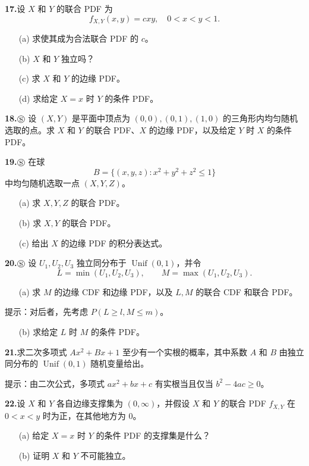 \documentclass[UTF8,12pt,a4paper,fontset=fandol]{ctexart}
\begin{document}
\noindent\textbf{17.}\quad 设 $X$ 和 $Y$ 的联合 PDF 为
\[
  f_{X,Y}(x,y)=cxy,\quad 0<x<y<1.
\]
\begin{enumerate}
  \item[(a)] 求使其成为合法联合 PDF 的 $c$。
  \item[(b)] $X$ 和 $Y$ 独立吗？
  \item[(c)] 求 $X$ 和 $Y$ 的边缘 PDF。
  \item[(d)] 求给定 $X=x$ 时 $Y$ 的条件 PDF。
\end{enumerate}

\noindent\textbf{18.}\quad $\circledS$ 设 $(X,Y)$ 是平面中顶点为 $(0,0),(0,1),(1,0)$ 的三角形内均匀随机选取的点。求 $X$ 和 $Y$ 的联合 PDF、$X$ 的边缘 PDF，以及给定 $Y$ 时 $X$ 的条件 PDF。

\noindent\textbf{19.}\quad $\circledS$ 在球
\[
  B=\{(x,y,z):x^2+y^2+z^2\le 1\}
\]
中均匀随机选取一点 $(X,Y,Z)$。
\begin{enumerate}
  \item[(a)] 求 $X,Y,Z$ 的联合 PDF。
  \item[(b)] 求 $X,Y$ 的联合 PDF。
  \item[(c)] 给出 $X$ 的边缘 PDF 的积分表达式。
\end{enumerate}

\noindent\textbf{20.}\quad $\circledS$ 设 $U_1,U_2,U_3$ 独立同分布于 $\operatorname{Unif}(0,1)$，并令
\[
  L=\min(U_1,U_2,U_3),\qquad M=\max(U_1,U_2,U_3).
\]
\begin{enumerate}
  \item[(a)] 求 $M$ 的边缘 CDF 和边缘 PDF，以及 $L,M$ 的联合 CDF 和联合 PDF。
\end{enumerate}
提示：对后者，先考虑 $P(L\ge l,M\le m)$。
\begin{enumerate}
  \item[(b)] 求给定 $L$ 时 $M$ 的条件 PDF。
\end{enumerate}

\noindent\textbf{21.}\quad 求二次多项式 $Ax^2+Bx+1$ 至少有一个实根的概率，其中系数 $A$ 和 $B$ 由独立同分布的 $\operatorname{Unif}(0,1)$ 随机变量给出。

提示：由二次公式，多项式 $ax^2+bx+c$ 有实根当且仅当 $b^2-4ac\ge 0$。

\noindent\textbf{22.}\quad 设 $X$ 和 $Y$ 各自边缘支撑集为 $(0,\infty)$，并假设 $X$ 和 $Y$ 的联合 PDF $f_{X,Y}$ 在 $0<x<y$ 时为正，在其他地方为 $0$。
\begin{enumerate}
  \item[(a)] 给定 $X=x$ 时 $Y$ 的条件 PDF 的支撑集是什么？
  \item[(b)] 证明 $X$ 和 $Y$ 不可能独立。
\end{enumerate}
\end{document}

